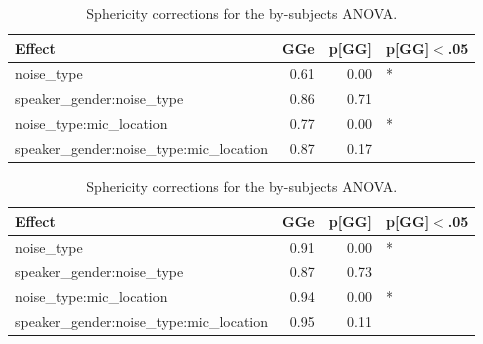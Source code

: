 \documentclass[dissertation,copyright]{uathesis}
\begin{document}
\begin{table}[ht]
\centering
\begin{tabular}{lrrl}
  \hline
Effect & GGe & p[GG] & p[GG]$<$.05 \\ 
  \hline
noise\_type & 0.61 & 0.00 & * \\ 
  speaker\_gender:noise\_type & 0.86 & 0.71 &  \\ 
  noise\_type:mic\_location & 0.77 & 0.00 & * \\ 
  speaker\_gender:noise\_type:mic\_location & 0.87 & 0.17 &  \\ 
   \hline
\end{tabular}
\caption{Sphericity corrections for the by-subjects ANOVA.} 
\label{tab:anova1_subj_sph_corr}
\end{table}
\begin{table}[ht]
\centering
\begin{tabular}{lrrl}
  \hline
Effect & GGe & p[GG] & p[GG]$<$.05 \\ 
  \hline
noise\_type & 0.91 & 0.00 & * \\ 
  speaker\_gender:noise\_type & 0.87 & 0.73 &  \\ 
  noise\_type:mic\_location & 0.94 & 0.00 & * \\ 
  speaker\_gender:noise\_type:mic\_location & 0.95 & 0.11 &  \\ 
   \hline
\end{tabular}
\caption{Sphericity corrections for the by-subjects ANOVA.} 
\label{tab:anova1_item_sph_corr}
\end{table}
\end{document}
